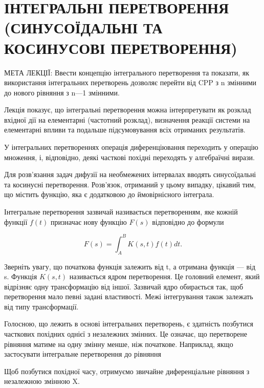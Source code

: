 \documentclass[
  ukrainian,
]{article}
\begin{document}
\section{ІНТЕГРАЛЬНІ ПЕРЕТВОРЕННЯ (СИНУСОЇДАЛЬНІ ТА КОСИНУСОВІ
ПЕРЕТВОРЕННЯ)}\label{ux456ux43dux442ux435ux433ux440ux430ux43bux44cux43dux456-ux43fux435ux440ux435ux442ux432ux43eux440ux435ux43dux43dux44f-ux441ux438ux43dux443ux441ux43eux457ux434ux430ux43bux44cux43dux456-ux442ux430-ux43aux43eux441ux438ux43dux443ux441ux43eux432ux456-ux43fux435ux440ux435ux442ux432ux43eux440ux435ux43dux43dux44f}

МЕТА ЛЕКЦІЇ: Ввести концепцію інтегрального перетворення та показати, як
використання інтегральних перетворень дозволяє перейти від CPP з n
змінними до нового рівняння з n---1 змінними.

Лекція показує, що інтегральні перетворення можна інтерпретувати як
розклад вхідної дії на елементарні (частотний розклад), визначення
реакції системи на елементарні впливи та подальше підсумовування всіх
отриманих результатів.

У інтегральних перетвореннях операція диференціювання переходить у
операцію множення, і, відповідно, деякі часткові похідні переходять у
алгебраїчні вирази.

Для розв'язання задач дифузії на необмежених інтервалах вводять
синусоїдальні та косинусні перетворення. Розв'язок, отриманий у цьому
випадку, цікавий тим, що містить функцію, яка є додатковою до
ймовірнісного інтеграла.

Інтегральне перетворення зазвичай називається перетворенням, яке кожній
функції \(f(t)\) призначає нову функцію \(F(s)\) відповідно до формули

\[
F(s) = \int_{A}^{B} K(s, t) f(t) dt.
\]

Зверніть увагу, що початкова функція залежить від t, а отримана функція
--- від s. Функція \(K(s,t)\) називається ядром перетворення. Це
головний елемент, який відрізняє одну трансформацію від іншої. Зазвичай
ядро обирається так, щоб перетворення мало певні задані властивості.
Межі інтегрування також залежать від типу трансформації.

Голосною, що лежить в основі інтегральних перетворень, є здатність
позбутися часткових похідних однієї з незалежних змінних. Це означає, що
перетворене рівняння матиме на одну змінну менше, ніж початкове.
Наприклад, якщо застосувати інтегральне перетворення до рівняння

Щоб позбутися похідної часу, отримуємо звичайне диференціальне рівняння
з незалежною змінною X.
\end{document}
